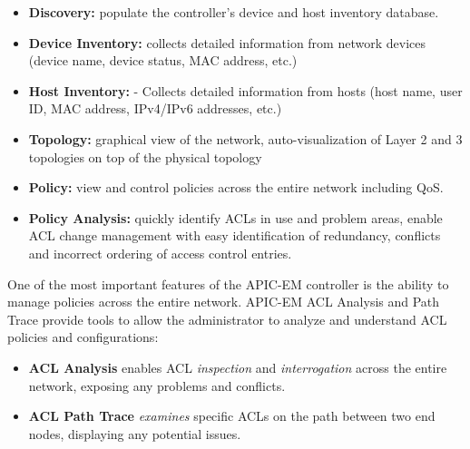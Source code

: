 \begin{itemize}
\item \textbf{Discovery:} populate the controller's device and host inventory database.

\item \textbf{Device Inventory:} collects detailed information from network devices (device name, device status, MAC address, etc.)

\item \textbf{Host Inventory:} - Collects detailed information from hosts (host name, user ID, MAC address, IPv4/IPv6 addresses, etc.)

\item \textbf{Topology:} graphical view of the network, auto-visualization of Layer 2 and 3 topologies on top of the physical topology

\item \textbf{Policy:} view and control policies across the entire network including QoS.

\item \textbf{Policy Analysis:} quickly identify ACLs in use and problem areas, enable ACL change management with easy identification of redundancy, conflicts and incorrect ordering of access control entries.
\end{itemize}

One of the most important features of the APIC-EM controller is the ability to manage policies across the entire network. APIC-EM ACL Analysis and Path Trace provide tools to allow the administrator to analyze and understand ACL policies and configurations: 

\begin{itemize}
\item \textbf{ACL Analysis} enables ACL \emph{inspection} and \emph{interrogation} across the entire network, exposing any problems and conflicts.

\item \textbf{ACL Path Trace} \emph{examines} specific ACLs on the path between two end nodes, displaying any potential issues.
\end{itemize}